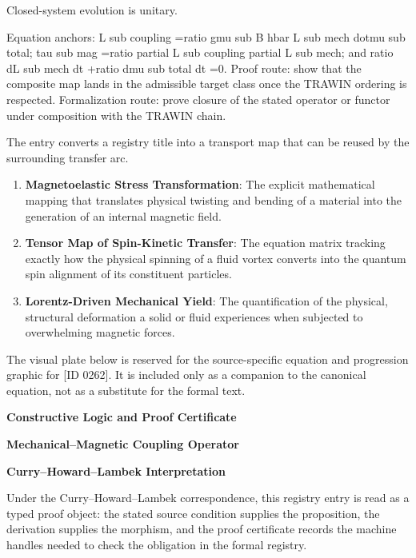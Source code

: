 Closed-system evolution is unitary.

Equation anchors: L sub coupling =ratio gmu sub B hbar L sub mech dotmu sub total; tau sub mag =ratio partial L sub coupling partial L sub mech; and ratio dL sub mech dt +ratio dmu sub total dt =0. Proof route: show that the composite map lands in the admissible target class once the TRAWIN ordering is respected. Formalization route: prove closure of the stated operator or functor under composition with the TRAWIN chain.

The entry converts a registry title into a transport map that can be reused by the surrounding transfer arc.
\endgroup

\begin{enumerate}[leftmargin=1.6em,itemsep=6pt,topsep=4pt]
\item \textbf{Magnetoelastic Stress Transformation}: The explicit mathematical mapping that translates physical twisting and bending of a material into the generation of an internal magnetic field.
\item \textbf{Tensor Map of Spin-Kinetic Transfer}: The equation matrix tracking exactly how the physical spinning of a fluid vortex converts into the quantum spin alignment of its constituent particles.
\item \textbf{Lorentz-Driven Mechanical Yield}: The quantification of the physical, structural deformation a solid or fluid experiences when subjected to overwhelming magnetic forces.
\end{enumerate}

\begingroup\footnotesize\sloppy
The visual plate below is reserved for the source-specific equation and progression graphic for [ID 0262]. It is included only as a companion to the canonical equation, not as a substitute for the formal text.
\par\endgroup
\ifTZPDarkEdition
{}
\fi

\clearpage
\begingroup\tzpsupportsetup
\noindent\textbf{\fontsize{10.8pt}{12.8pt}\selectfont [ID 0262] Constructive Logic and Proof Certificate}\par
\noindent\textbf{\fontsize{10pt}{12pt}\selectfont Mechanical--Magnetic Coupling Operator}\par
\vspace{0.45em}
\begingroup
\footnotesize
\setlength{\parskip}{0.22em}
\setlength{\parindent}{0pt}
\noindent\textbf{Curry--Howard--Lambek Interpretation}\par
Under the Curry--Howard--Lambek correspondence, this registry entry is read as a typed proof
object: the stated source condition supplies the proposition, the derivation supplies the
morphism, and the proof certificate records the machine handles needed to check the obligation
in the formal registry.


